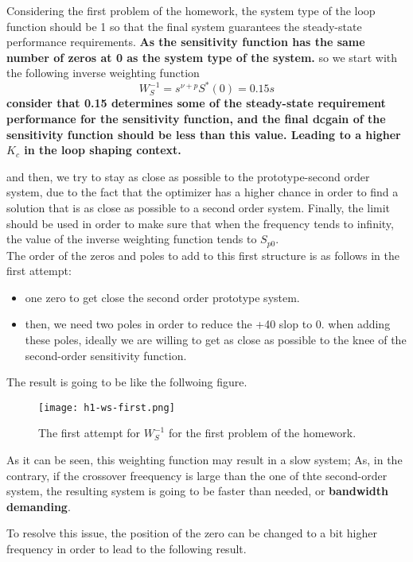 Considering the first problem of the homework, the system type of the loop function should be 1 so that the final system guarantees the steady-state performance requirements. \textbf{As the sensitivity function has the same number of zeros at 0 as the system type of the system.} so we start with the following inverse weighting function
\[
W_S^{-1} = s^{\nu + p} S^{*}(0) = 0.15s
\]
\textbf{consider that 0.15 determines some of the steady-state requirement performance for the sensitivity function, and the final dcgain of the sensitivity function should be less than this value. Leading to a higher $K_c$ in the loop shaping context.}

and then, we try to stay as close as possible to the prototype-second order system, due to the fact that the optimizer has a higher chance in order to find a solution that is as close as possible to a second order system. Finally, the limit should be used in order to make sure that when the frequency tends to infinity, the value of the inverse weighting function tends to $S_{p0}$. \\

The order of the zeros and poles to add to this first structure is as follows in the first attempt:
\begin{itemize}
    \item one zero to get close the second order prototype system.
    \item then, we need two poles in order to reduce the +40 slop to 0. when adding these poles, ideally we are willing to get as close as possible to the knee of the second-order sensitivity function.
\end{itemize}

The result is going to be like the follwoing figure.

\begin{figure}[H]
    \centering
    \texttt{[image: h1-ws-first.png]}
    \caption{The first attempt for $W_S^{-1}$ for the first problem of the homework.}
\end{figure}

As it can be seen, this weighting function may result in a slow system; As, in the contrary, if the crossover freequency is large than the one of thte second-order system, the resulting system is going to be faster than needed, or \textbf{bandwidth demanding}.

To resolve this issue, the position of the zero can be changed to a bit higher frequency in order to lead to the following result.

